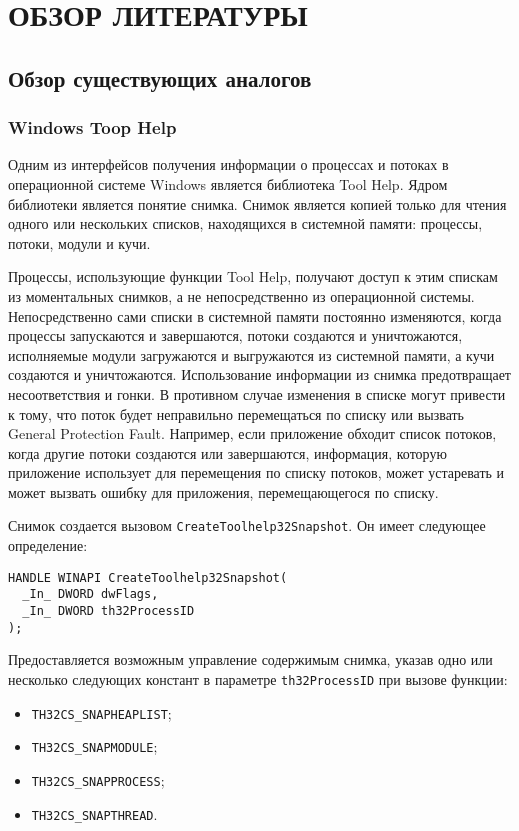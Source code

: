 \section{ОБЗОР ЛИТЕРАТУРЫ}
\label{sec:domain}

\subsection{Обзор существующих аналогов}
\label{sub:domain:analogs}

\subsubsection{Windows Toop Help}
\label{sub:domain:analogs:windows}

Одним из интерфейсов получения информации о процессах и потоках в операционной
системе Windows является библиотека Tool Help\cite{tool_help_article}. Ядром
библиотеки является понятие снимка. Снимок является копией только для чтения
одного или нескольких списков, находящихся в системной памяти:
процессы, потоки, модули и кучи.

Процессы, использующие функции Tool Help, получают доступ к этим спискам из
моментальных снимков, а не непосредственно из операционной системы.
Непосредственно сами списки в системной памяти постоянно изменяются, когда
процессы запускаются и завершаются, потоки создаются и уничтожаются, исполняемые
модули загружаются и выгружаются из системной памяти, а кучи создаются и
уничтожаются. Использование информации из снимка предотвращает несоответствия и
гонки. В противном случае изменения в списке могут привести к тому, что поток
будет неправильно перемещаться по списку или вызвать General Protection Fault.
Например, если приложение обходит список потоков, когда другие потоки создаются
или завершаются, информация, которую приложение использует для перемещения по
списку потоков, может устаревать и может вызвать ошибку для приложения,
перемещающегося по списку.

Снимок создается вызовом \texttt{CreateToolhelp32Snapshot}. Он имеет следующее
определение\cite{win_tool_help}:

\medskip
\begin{lstlisting}[style=cstyle]
HANDLE WINAPI CreateToolhelp32Snapshot(
  _In_ DWORD dwFlags,
  _In_ DWORD th32ProcessID
);
\end{lstlisting}
\medskip

Предоставляется возможным управление содержимым снимка, указав одно или
несколько следующих констант в параметре \texttt{th32ProcessID} при вызове
функции:
\begin{itemize}
\item \texttt{TH32CS\_SNAPHEAPLIST};
\item \texttt{TH32CS\_SNAPMODULE};
\item \texttt{TH32CS\_SNAPPROCESS};
\item \texttt{TH32CS\_SNAPTHREAD}.
\end{itemize}

